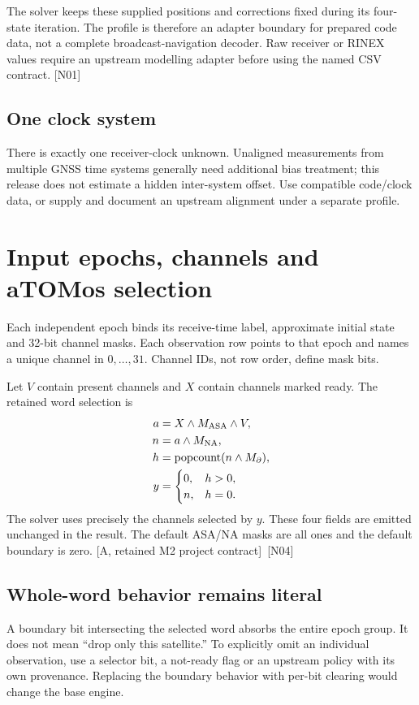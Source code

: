 \documentclass[11pt,a4paper]{article}
\newcommand{\base}{\textcolor{muted}{[A, retained M2 project contract]}}
\newcommand{\dec}[1]{\textcolor{accent}{[N#1]}}
\newcommand{\pop}{\operatorname{popcount}}
\begin{document}
The solver keeps these supplied positions and corrections fixed during its four-state
iteration. The profile is therefore an adapter boundary for prepared code data,
not a complete broadcast-navigation decoder. Raw receiver or RINEX values require
an upstream modelling adapter before using the named CSV contract. \dec{01}

\subsection{One clock system}
There is exactly one receiver-clock unknown. Unaligned measurements from multiple
GNSS time systems generally need additional bias treatment; this release does not
estimate a hidden inter-system offset. Use compatible code/clock data, or supply
and document an upstream alignment under a separate profile.
\clearpage

\section{Input epochs, channels and aTOMos selection}
Each independent epoch binds its receive-time label, approximate initial state and
32-bit channel masks. Each observation row points to that epoch and names a unique
channel in $0,\ldots,31$. Channel IDs, not row order, define mask bits.

Let $V$ contain present channels and $X$ contain channels marked ready. The retained
word selection is
\begin{align}
a&=X\land M_{\rm ASA}\land V,\\
n&=a\land M_{\rm NA},\\
h&=\pop(n\land M_\partial),\\
y&=\begin{cases}0,&h>0,\\n,&h=0.\end{cases}
\end{align}
The solver uses precisely the channels selected by $y$. These four fields are emitted
unchanged in the result. The default ASA/NA masks are all ones and the default boundary
is zero. \base\ \dec{04}

\subsection{Whole-word behavior remains literal}
A boundary bit intersecting the selected word absorbs the entire epoch group. It
does not mean ``drop only this satellite.'' To explicitly omit an individual observation,
use a selector bit, a not-ready flag or an upstream policy with its own provenance.
Replacing the boundary behavior with per-bit clearing would change the base engine.
\end{document}

